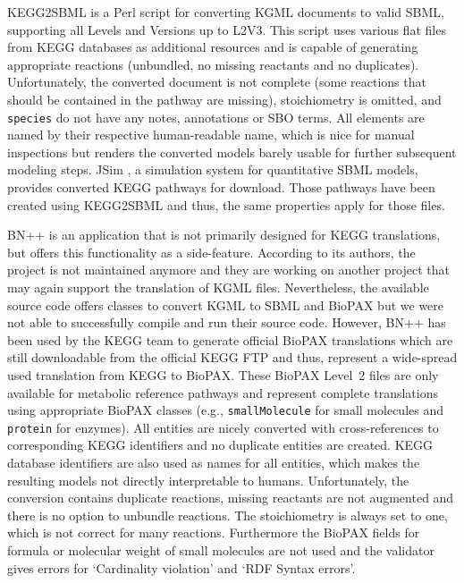 \documentclass[10pt]{bmc_article}
\newenvironment{bmcformat}{\baselineskip20pt\sloppy\setboolean{publ}{false}}{\baselineskip20pt\sloppy}
\newcommand{\protein}{\texttt{protein}}
\newcommand{\species}{\texttt{species}}
\newcommand{\smallMolecule}{\texttt{small\-Molecule}}
\begin{document}
\begin{bmcformat}
KEGG2SBML \cite{KEGG2SBML} is a Perl script for converting KGML documents to valid SBML, supporting all Levels and Versions up to L2V3. This script uses various flat files from KEGG databases as additional resources and is capable of generating appropriate reactions (unbundled, no missing reactants and no duplicates). Unfortunately, the converted document is not complete (some reactions that should be contained in the pathway are missing), stoichiometry is omitted, and \species{} do not have any notes, annotations or SBO terms. All elements are named by their respective human-readable name, which is nice for manual inspections but renders the converted models barely usable for further subsequent modeling steps. JSim \cite{JSim}, a simulation system for quantitative SBML models, provides converted KEGG pathways for download. Those pathways have been created using KEGG2SBML and thus, the same properties apply for those files.

BN++ \cite{Kuentzer2007} is an application that is not primarily designed for KEGG translations, but offers this functionality as a side-feature. According to its authors, the project is not maintained anymore and they are working on another project that may again support the translation of KGML files. Nevertheless, the available source code offers classes to convert KGML to SBML and BioPAX but we were not able to successfully compile and run their source code. However, BN++ has been used by the KEGG team to generate official BioPAX translations which are still downloadable from the official KEGG FTP and thus, represent a wide-spread used translation from KEGG to BioPAX. These BioPAX Level~2 files are only available for metabolic reference pathways and represent complete translations using appropriate BioPAX classes (e.g., \smallMolecule{} for small molecules and \protein{} for enzymes). All entities are nicely converted with cross-references to corresponding KEGG identifiers and no duplicate entities are created. KEGG database identifiers are also used as names for all entities, which makes the resulting models not directly interpretable to humans. Unfortunately, the conversion contains duplicate reactions, missing reactants are not augmented and there is no option to unbundle reactions. The stoichiometry is always set to one, which is not correct for many reactions. Furthermore the BioPAX fields for formula or molecular weight of small molecules are not used and the validator gives errors for `Cardinality violation' and `RDF Syntax errors'.


\end{bmcformat}
\end{document}
